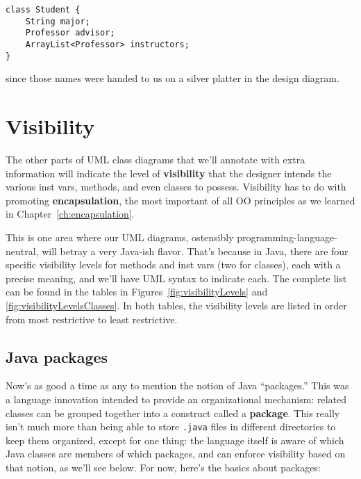 \begin{Verbatim}[fontsize=\small,samepage=true,frame=single]
class Student {
    String major;    
    Professor advisor;
    ArrayList<Professor> instructors;
}
\end{Verbatim}

since those names were handed to us on a silver platter in the design diagram.

\section{Visibility}

The other parts of UML class diagrams that we'll annotate with extra
information will indicate the level of \textbf{visibility} that the designer
intends the various inst vars, methods, and even classes to possess.
Visibility has to do with promoting \textbf{encapsulation}, the most important
of all OO principles as we learned in Chapter~\ref{ch:encapsulation}.

This is one area where our UML diagrams, ostensibly
programming-language-neutral, will betray a very Java-ish flavor. That's
because in Java, there are four specific visibility levels for methods and
inst vars (two for classes), each with a precise meaning, and we'll have UML
syntax to indicate each. The complete list can be found in the tables in
Figures~\ref{fig:visibilityLevels} and \ref{fig:visibilityLevelsClasses}. In
both tables, the visibility levels are listed in order from most restrictive
to least restrictive.

\subsection{Java packages}
\label{sec:packages}

Now's as good a time as any to mention the notion of Java ``packages.'' This
was a language innovation intended to provide an organizational mechanism:
related classes can be grouped together into a construct called a
\textbf{package}. This really isn't much more than being able to store
\texttt{.java} files in different directories to keep them organized, except
for one thing: the language itself is aware of which Java classes are members
of which packages, and can enforce visibility based on that notion, as we'll
see below. For now, here's the basics about packages:

